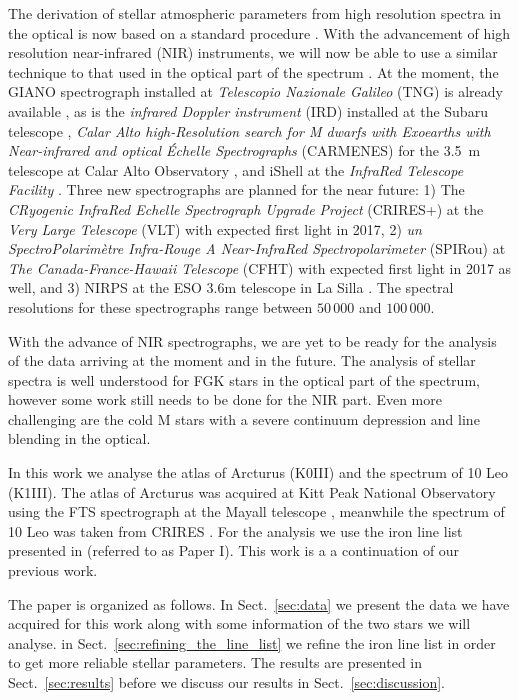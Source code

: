 \documentclass{aa}
\begin{document}
The derivation of stellar atmospheric parameters from high resolution spectra in
the optical is now based on a standard procedure
\citep[see e.g.][]{Valenti2005,Sousa2008a}. With the advancement of high
resolution near-infrared (NIR) instruments, we will now be able to use a similar
technique to that used in the optical part of the spectrum
\citep[see e.g.][]{Melendez1999,Sousa2008a,Tsantaki2013,Mucciarelli2013,Bensby2014}.
At the moment, the GIANO spectrograph installed at \emph{Telescopio Nazionale
Galileo} (TNG) is already available \citep{GIANO}, as is the \emph{infrared Doppler
instrument} (IRD) installed at the Subaru telescope \citep{IRD}, \emph{Calar
Alto high-Resolution search for M dwarfs with Exoearths with Near-infrared and
optical Échelle Spectrographs} (CARMENES) for the \SI{3.5}{m} telescope at Calar
Alto Observatory \citep{CARMENES}, and iShell at the \emph{InfraRed Telescope
Facility} \citep{ishell1,ishell2}. Three new spectrographs are
planned for the near future: 1) The \emph{CRyogenic InfraRed Echelle
Spectrograph Upgrade Project} (CRIRES+) at the \emph{Very Large Telescope} (VLT)
\citep{CRIRESp} with expected first light in 2017, 2) \emph{un
SpectroPolarimètre Infra-Rouge A Near-InfraRed Spectropolarimeter} (SPIRou) at
\emph{The Canada-France-Hawaii Telescope} (CFHT) \citep{SPIROU1,SPIROU2} with
expected first light in 2017 as well, and 3) NIRPS at the ESO 3.6m telescope in
La Silla \citep{NIRPS}. The spectral resolutions for these spectrographs range
between $50\,000$ and $100\,000$.

With the advance of NIR spectrographs, we are yet to be ready for the analysis
of the data arriving at the moment and in the future. The analysis of stellar
spectra is well understood for FGK stars in the optical part of the spectrum,
however some work still needs to be done for the NIR part. Even more challenging
are the cold M stars with a severe continuum depression and line blending in the
optical.

In this work we analyse the atlas of Arcturus (K0III) and the spectrum of 10 Leo
(K1III). The atlas of Arcturus was acquired at Kitt Peak National Observatory
using the FTS spectrograph at the Mayall telescope \citep{Hinkle2003}, meanwhile
the spectrum of 10 Leo was taken from CRIRES \citep{Nicholls2016}. For the
analysis we use the iron line list presented in \citet{Andreasen2016} (referred
to as Paper I). This work is a a continuation of our previous work.

The paper is organized as follows. In Sect.~\ref{sec:data} we present the data
we have acquired for this work along with some information of the two stars we
will analyse. in Sect.~\ref{sec:refining_the_line_list} we refine the iron line
list in order to get more reliable stellar parameters. The results are presented
in Sect.~\ref{sec:results} before we discuss our results in
Sect.~\ref{sec:discussion}.
\end{document}
